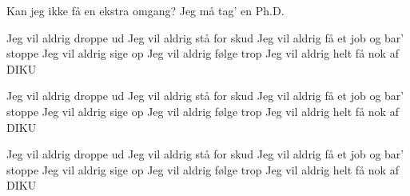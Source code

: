\documentclass[a4paper,11pt]{article}
\begin{document}
\begin{song}
            Kan jeg ikke få en ekstra omgang?
            Jeg må tag' en Ph.D.

            Jeg vil aldrig droppe ud
            Jeg vil aldrig stå for skud
            Jeg vil aldrig få et job og bar' stoppe
            Jeg vil aldrig sige op
            Jeg vil aldrig følge trop
            Jeg vil aldrig helt få nok af DIKU

            Jeg vil aldrig droppe ud
            Jeg vil aldrig stå for skud
            Jeg vil aldrig få et job og bar' stoppe
            Jeg vil aldrig sige op
            Jeg vil aldrig følge trop
            Jeg vil aldrig helt få nok af DIKU

            Jeg vil aldrig droppe ud
            Jeg vil aldrig stå for skud
            Jeg vil aldrig få et job og bar' stoppe
            Jeg vil aldrig sige op
            Jeg vil aldrig følge trop
            Jeg vil aldrig helt få nok af DIKU

\end{song}
\end{document}
